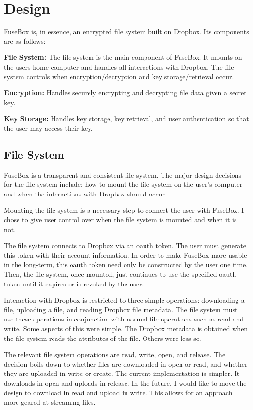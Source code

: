 \documentclass[11pt,twocolumn,letterpaper]{article}
\newcommand{\appname}{FuseBox }
\newcommand{\appnameWOspace}{FuseBox}
\begin{document}
\section{Design}
\label{sec:design}
\appname is, in essence, an encrypted file system built on
Dropbox. Its components are as follows:
\par {\bf File System:} The file system is the main component of 
\appnameWOspace. It mounts on the users home computer and handles 
all interactions with Dropbox. The file system controls when
encryption/decryption and key storage/retrieval occur.   
\par {\bf Encryption:} Handles securely encrypting and decrypting file data
given a secret key. 
\par {\bf Key Storage:} Handles key storage, key retrieval, and user
authentication so that the user may access their key. 

\subsection{File System}
\label{sec:fs}
\appname is a transparent and consistent file system. The major design
decisions for the file system include: how to mount the file system on
the user's computer and when the interactions with Dropbox should
occur. 
\par Mounting the file system is a necessary step to connect the user
with \appnameWOspace. I chose to give user control over when the file
system is mounted and when it is not.  
\par The file system connects to Dropbox via an oauth token. The user must
generate this token with their account information. In order to make
\appname more usable in the long-term, this oauth token need only be
constructed by the user one time. Then, the file system, once mounted,
just continues to use the specified oauth token until it expires or is
revoked by the user. 
\par Interaction with Dropbox is restricted to three simple
operations: downloading a file, uploading a file, and reading Dropbox
file metadata. The file system must use these operations in
conjunction with normal file operations such as read and write. Some
aspects of this were simple. The Dropbox metadata is obtained when the
file system reads the attributes of the file. Others were less so.
\par The relevant file system operations are read, write, open, and
release. The decision boils down to whether files are downloaded in
open or read, and whether they are uploaded in write or create. The
current implementation is simpler. It downloads in open and uploads in
release. In the future, I would like to move the design to download in
read and upload in write. This allows for an approach more geared at
streaming files. 
\end{document}
